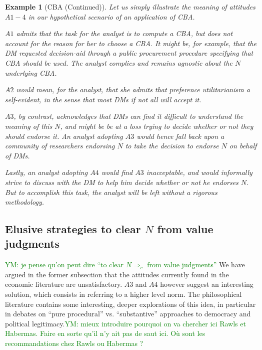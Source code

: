 \documentclass[preprint, french, english, 11pt, authoryear]{elsarticle}%
\newcommand{\protectforpdf}[1]{\texorpdfstring{\ensuremath{#1}}{#1}}
\newtheorem{example}{Example}
\newcommand{\commentYM}[1]{\textcolor{green}{YM: #1}}
\begin{document}
\begin{example}[CBA (Continued)]
Let us simply illustrate the meaning of attitudes $A1-4$ in our hypothetical scenario of an application of CBA.

$A1$ admits that the task for the analyst is to compute a CBA, but does not account for the reason for her to choose a CBA. It might be, for example, that the \ac{DM} requested decision-aid through a public procurement procedure specifying that CBA should be used. The analyst complies and remains agnostic about the $N$ underlying CBA.

$A2$ would mean, for the analyst, that she admits that preference utilitarianism a self-evident, in the sense that most \acp{DM} if not all will accept it.

$A3$, by contrast, acknowledges that \acp{DM} can find it difficult to understand the meaning of this $N$, and might be be at a loss trying to decide whether or not they should endorse it. An analyst adopting $A3$ would hence fall back upon a community of researchers endorsing $N$ to take the decision to endorse $N$ on behalf of \acp{DM}.

Lastly, an analyst adopting $A4$ would find $A3$ inacceptable, and would informally strive to discuss with the \ac{DM} to help him decide whether or not he endorses $N$. But to accomplish this task, the analyst will be left without a rigorous methodology.
\end{example}


\subsection{Elusive strategies to clear \protectforpdf{N} from value judgments}\commentYM{je pense qu'on peut dire ``to clear $N ⇒_c$ from value judgments''}
We have argued in the former subsection that the attitudes currently found in the economic literature are unsatisfactory. $A3$ and $A4$ however suggest an interesting solution, which consists in referring to a higher level norm. The philosophical literature contains some interesting, deeper explorations of this idea, in particular in debates on “pure procedural” vs. “substantive” approaches to democracy and political legitimacy.\commentYM{mieux introduire pourquoi on va chercher ici Rawls et Habermas. Faire en sorte qu'il n'y ait pas de saut ici. Où sont les recommandations chez Rawls ou Habermas ?}
\end{document}
